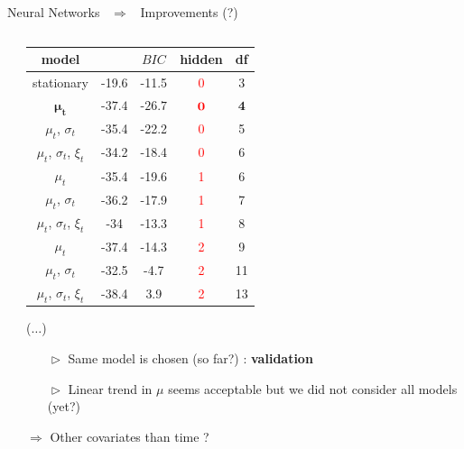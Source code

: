 \documentclass[9pt,xcolor={dvipsnames}]{beamer}
\begin{document}
\begin{frame}[fragile, t]{Neural Networks \ $\Rightarrow$ \ Improvements (?)}
\begin{columns}[T]
\begin{column}{.6\textwidth}
\begin{columns}[c]
\end{columns}


\end{column}
\vspace{-2.8cm}
\hspace{.5pt}\vrule width 1.4pt \hspace{2pt}


 \begin{column}[t]{0.5\textwidth}\fontsize{7}{7}\selectfont
 	      \vspace{-.9cm}%
 	\begin{center}
 		\begin{tabular}{|c||c|c|c|c|}
 			\hline
 			\textbf{model} & \text{$AIC_c$} & $BIC$ & hidden & df \\
 			\hline
 			\hline
 			stationary & -19.6 & -11.5 & \textcolor{red}{0} & 3 \\
 			\hline
 			$\boldsymbol{\mu_t}$ & -$\boldsymbol{37.4}$ & -$\boldsymbol{26.7}$ & $\boldsymbol{\textcolor{red}{0}}$ & $\boldsymbol{4}$  \\
 			\hline
 			$\mu_t$, $\sigma_t$ & -35.4 & -22.2 & \textcolor{red}{0} & 5 \\
 			\hline
 			$\mu_t$, $\sigma_t$, $\xi_t$ & -34.2 & -18.4 & \textcolor{red}{0} & 6 \\
 			\hline
 			$\mu_t$ & -35.4 & -19.6 & \textcolor{red}{1} & 6 \\
 			\hline
 			$\mu_t$, $\sigma_t$ &  -36.2  & -17.9 & \textcolor{red}{1} & 7 \\ 
 			\hline
 			$\mu_t$, $\sigma_t$, $\xi_t$ & -34 & -13.3 & \textcolor{red}{1} & 8 \\
 			\hline
 			$\mu_t$ & -37.4 & -14.3 & \textcolor{red}{2} & 9 \\
 			\hline
 			$\mu_t$, $\sigma_t$ & -32.5 & -4.7 & \textcolor{red}{2} & 11 \\
 			\hline
 			$\mu_t$, $\sigma_t$, $\xi_t$ & -38.4 & 3.9 & \textcolor{red}{2} & 13 \\
 		\end{tabular}
 		\vspace{-.3cm}
 		 	\end{center} 
 		  \quad\quad \tiny ($\dots$) \hspace{1cm}\qquad	%
 		  \vspace{.2cm}
 	\begin{itemize}\fontsize{7}{7}\selectfont
 	 	\item[$\vartriangleright$] Same model is chosen (so far?) : \textbf{validation}
 	 	\item[$\vartriangleright$] Linear trend in $\mu$ seems acceptable but we did not consider all models (yet?)
 	 \end{itemize}
 	\quad\qquad $\Rightarrow$ Other covariates than time ? 
\end{column}
 

\end{columns}
\end{frame}
\end{document}
